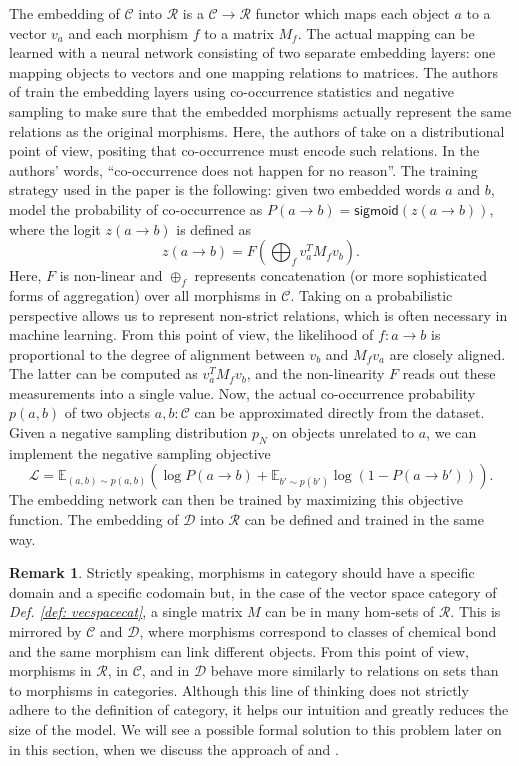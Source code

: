\documentclass[11pt,a4paper,openright,twoside]{report}
\newcounter{mycounter}
\theoremstyle{plain}
\theoremstyle{definition}
\newtheorem{remark}[mycounter]{Remark}
\newcommand\dblquote[1]{\textquotedblleft #1\textquotedblright}
\begin{document}
The embedding of $\mathcal{C}$ into $\mathcal{R}$ is a $\mathcal{C} \to \mathcal{R}$ functor which maps each object $a$ to a vector $v_a$ and each morphism $f$ to a matrix $M_f$. The actual mapping can be learned with a neural network consisting of two separate embedding layers: one mapping objects to vectors and one mapping relations to matrices. The authors of \cite{sheshmani2021categorical} train the embedding layers using co-occurrence statistics and negative sampling to make sure that the embedded morphisms actually represent the same relations as the original morphisms. Here, the authors of \cite{sheshmani2021categorical} take on a distributional point of view, positing that co-occurrence must encode such relations. In the authors' words, \dblquote{co-occurrence does not happen for no reason}. The training strategy used in the paper is the following: given two embedded words $a$ and $b$, model the probability of co-occurrence as $P(a \to b) = \mathsf{sigmoid}(z(a \to b))$, where the logit $z(a \to b)$ is defined as
\[z(a \to b) = F\left(\bigoplus_f v_a^TM_fv_b \right).\]
Here, $F$ is non-linear and $\oplus_f$ represents concatenation (or more sophisticated forms of aggregation) over all morphisms in $\mathcal{C}$. Taking on a probabilistic perspective allows us to represent non-strict relations, which is often necessary in machine learning. From this point of view, the likelihood of $f: a \to b$ is proportional to the degree of alignment between $v_b$ and $M_fv_a$ are closely aligned. The latter can be computed as $v_a^TM_fv_b$, and the non-linearity $F$ reads out these measurements into a single value. Now, the actual co-occurrence probability $p(a,b)$ of two objects $a,b : \mathcal{C}$ can be approximated directly from the dataset. Given a negative sampling distribution $p_N$ on objects unrelated to $a$, we can implement the negative sampling objective
\[\mathcal{L} = \mathbb{E}_{(a,b) \sim p(a,b)}\left(\log P(a \to b) + \mathbb{E}_{b' \sim p(b')}\log (1-P(a \to b'))\right).\]
The embedding network can then be trained by maximizing this objective function. The embedding of $\mathcal{D}$ into $\mathcal{R}$ can be defined and trained in the same way.

\begin{remark}
  Strictly speaking, morphisms in category should have a specific domain and a specific codomain but, in the case of the vector space category of \textit{Def. \ref{def: vecspacecat}}, a single matrix $M$ can be in many hom-sets of $\mathcal{R}$. This is mirrored by $\mathcal{C}$ and $\mathcal{D}$, where morphisms correspond to classes of chemical bond and the same morphism can link different objects. From this point of view, morphisms in $\mathcal{R}$, in $\mathcal{C}$, and in $\mathcal{D}$ behave more similarly to relations on sets than to morphisms in categories.  Although this line of thinking does not strictly adhere to the definition of category, it helps our intuition and greatly reduces the size of the model. We will see a possible formal solution to this problem later on in this section, when we discuss the approach of \cite{coecke2010mathematical} and \cite{lewis2019compositionality}.
\end{remark}
\end{document}
